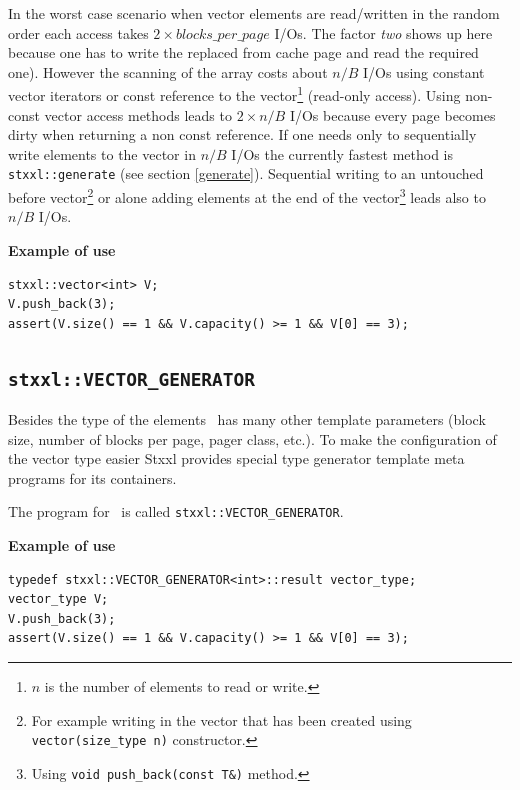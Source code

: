 \documentclass[twoside]{book}
\newcommand{\stxxl}{{\sc Stxxl} }
\begin{document}
In the worst case scenario when vector elements are
read/written in the random order each access takes $2 \times
blocks\_per\_page$ I/Os. The factor \emph{two} shows up here because one has
to write the replaced from cache page and read the required
one). However the scanning of the array costs about $n/B$ I/Os using
constant vector iterators or const reference to the
vector\footnote{$n$ is the number of elements to read or write.}
(read-only 
access). Using non-const vector access methods leads to $2 \times n/B$
I/Os because every page becomes dirty when returning a non const
reference. 
If one needs only to sequentially write elements to the vector in
$n/B$ I/Os the 
currently fastest method is \texttt{stxxl::generate} (see section
\ref{generate}). Sequential writing to an untouched before 
vector\footnote{For example writing in the vector that has been
created using 
\texttt{vector(size\_type n)} constructor.} or alone 
adding elements at the end of the vector\footnote{Using \texttt{void
push\_back(const T\&)} method.} leads also to $n/B$ I/Os.  

{\bf Example of use}
\begin{lstlisting}
stxxl::vector<int> V;
V.push_back(3);
assert(V.size() == 1 && V.capacity() >= 1 && V[0] == 3);
\end{lstlisting}

\newcommand{\xvectorg}{\texttt{stxxl::VECTOR\_GENERATOR}}

\subsection{\xvectorg}


Besides the type of the elements \xvector\ has many other template parameters
(block size, number of blocks per page, pager class, etc.). To make
the configuration of the vector type easier \stxxl
provides special type generator template meta programs for its
containers.  

The program
for \xvector\ is called \xvectorg.

{\bf Example of use}
\begin{lstlisting}
typedef stxxl::VECTOR_GENERATOR<int>::result vector_type;
vector_type V;
V.push_back(3);
assert(V.size() == 1 && V.capacity() >= 1 && V[0] == 3);
\end{lstlisting}
\end{document}
